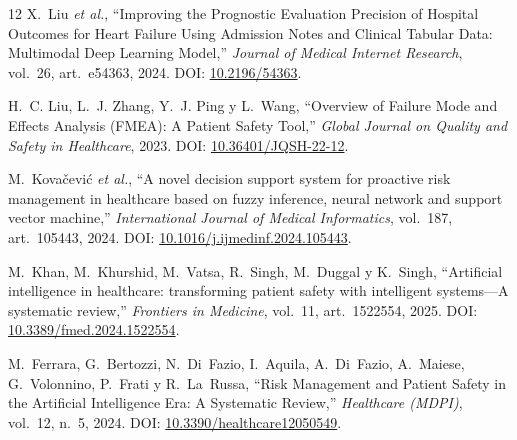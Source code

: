 \documentclass[11pt,a4paper]{article}
\begin{document}
\begin{thebibliography}{12}
X.~Liu \textit{et al.},
\enquote{Improving the Prognostic Evaluation Precision of Hospital Outcomes for Heart Failure Using Admission Notes and Clinical Tabular Data: Multimodal Deep Learning Model,}
\textit{Journal of Medical Internet Research}, vol.~26, art.~e54363, 2024.
DOI: \href{https://doi.org/10.2196/54363}{10.2196/54363}.

H.~C. Liu, L.~J. Zhang, Y.~J. Ping y L.~Wang,
\enquote{Overview of Failure Mode and Effects Analysis (FMEA): A Patient Safety Tool,}
\textit{Global Journal on Quality and Safety in Healthcare}, 2023.
DOI: \href{https://doi.org/10.36401/JQSH-22-12}{10.36401/JQSH-22-12}.

M.~Kovačević \textit{et al.},
\enquote{A novel decision support system for proactive risk management in healthcare based on fuzzy inference, neural network and support vector machine,}
\textit{International Journal of Medical Informatics}, vol.~187, art.~105443, 2024.
DOI: \href{https://doi.org/10.1016/j.ijmedinf.2024.105443}{10.1016/j.ijmedinf.2024.105443}.

M.~Khan, M.~Khurshid, M.~Vatsa, R.~Singh, M.~Duggal y K.~Singh,
\enquote{Artificial intelligence in healthcare: transforming patient safety with intelligent systems---A systematic review,}
\textit{Frontiers in Medicine}, vol.~11, art.~1522554, 2025.
DOI: \href{https://doi.org/10.3389/fmed.2024.1522554}{10.3389/fmed.2024.1522554}.

M.~Ferrara, G.~Bertozzi, N.~Di~Fazio, I.~Aquila, A.~Di~Fazio, A.~Maiese, G.~Volonnino, P.~Frati y R.~La~Russa,
\enquote{Risk Management and Patient Safety in the Artificial Intelligence Era: A Systematic Review,}
\textit{Healthcare (MDPI)}, vol.~12, n.\textordmasculine~5, 2024.
DOI: \href{https://doi.org/10.3390/healthcare12050549}{10.3390/healthcare12050549}.

\end{thebibliography}
\end{document}
